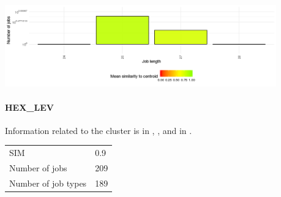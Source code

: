 \documentclass[]{llncs}
\begin{document}
\begingroup
  \centering
  \includegraphics[width=4.61in,height=1.39in]{./media/image6.png}
  \label{fig:use_case:bin_aggzeros:length}
\endgroup


\paragraph{HEX\_LEV}
Information related to the cluster is in , , and in .

\begingroup
  \centering
  \begin{tabular}{ll}
    SIM & 0.9 \\
    Number of jobs & 209 \\
    Number of job types & 189 \\
  \end{tabular}
  \label{tab:use_case:hex_lev:stats}
\endgroup
\end{document}

